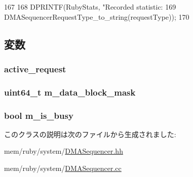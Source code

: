 \begin{DoxyCode}
167                                                                    {
168     DPRINTF(RubyStats, "Recorded statistic: %
169             DMASequencerRequestType_to_string(requestType));
170 }
\end{DoxyCode}


\subsection{変数}
\hypertarget{classDMASequencer_a87d1d4cc184a5195caafa5211a90e17f}{
\subsubsection[{active\_\-request}]{ {\bf active\_\-request}}}
\label{classDMASequencer_a87d1d4cc184a5195caafa5211a90e17f}
\hypertarget{classDMASequencer_ab6ef6a22fa2f33fcb00664f27f3f1866}{
\subsubsection[{m\_\-data\_\-block\_\-mask}]{\setlength{\rightskip}{0pt plus 5cm}uint64\_\-t {\bf m\_\-data\_\-block\_\-mask}}}
\label{classDMASequencer_ab6ef6a22fa2f33fcb00664f27f3f1866}
\hypertarget{classDMASequencer_a26268a7b4af6fad845b715a8b082ab8a}{
\subsubsection[{m\_\-is\_\-busy}]{\setlength{\rightskip}{0pt plus 5cm}bool {\bf m\_\-is\_\-busy}}}
\label{classDMASequencer_a26268a7b4af6fad845b715a8b082ab8a}


このクラスの説明は次のファイルから生成されました:\begin{DoxyCompactItemize}
\item 
mem/ruby/system/\hyperlink{DMASequencer_8hh}{DMASequencer.hh}\item 
mem/ruby/system/\hyperlink{DMASequencer_8cc}{DMASequencer.cc}\end{DoxyCompactItemize}
